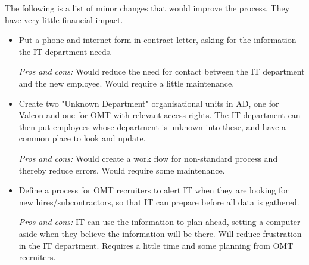 The following is a list of minor changes that would improve the process.
They have very little financial impact.
\begin{itemize}
\item Put a phone and internet form in contract letter, asking for the information the IT department needs.

\emph{Pros and cons:} Would reduce the need for contact between the IT department and the new employee.
Would require a little maintenance.

\item Create two "Unknown Department" organisational units in AD, one for Valcon and one for OMT with relevant access rights. The IT department can then put employees whose department is unknown into these, and have a common place to look and update.

\emph{Pros and cons:} Would create a work flow for non-standard process and thereby reduce errors. Would require some maintenance.

\item Define a process for OMT recruiters to alert IT when they are looking for new hires/subcontractors, so that IT can prepare before all data is gathered.

\emph{Pros and cons:} IT can use the information to plan ahead, setting a computer aside when they believe the information will be there. Will reduce frustration in the IT department. Requires a little time and some planning from OMT recruiters.
\end{itemize}
